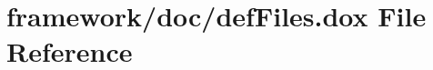 \hypertarget{def_files_8dox}{}\section{framework/doc/def\+Files.dox File Reference}
\label{def_files_8dox}
